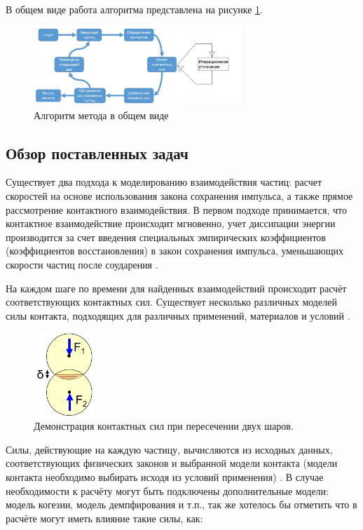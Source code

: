 \documentclass[utf8x, 14pt, oneside, a4paper]{article}
\begin{document}
В общем виде работа алгоритма представлена на рисунке \ref{pic:algo}.

\begin{figure}[H]
	\centering
	\includegraphics[width=0.7\textwidth]{algorithm}
	\caption{Алгоритм метода в общем виде}
	\label{pic:algo}
\end{figure} 

\subsection*{Обзор поставленных задач}

Существует два подхода к моделированию взаимодействия частиц: расчет скоростей на основе использования закона сохранения импульса, а также прямое рассмотрение контактного взаимодействия. В первом подходе принимается, что контактное взаимодействие происходит мгновенно, учет диссипации энергии производится за счет введения специальных эмпирических коэффициентов (коэффициентов восстановления) в закон сохранения импульса, уменьшающих скорости частиц после соударения \cite{cundall}.

На каждом шаге по времени для найденных взаимодействий происходит расчёт соответствующих контактных сил.
Существует несколько различных моделей силы контакта, подходящих для различных применений, материалов и условий \cite{hard_aglomerath}.

\begin{figure}[h!]
	\centering
	\includegraphics[width=0.2\textwidth]{vhod}
	\caption{Демонстрация контактных сил при пересечении двух шаров.}
\end{figure} 

Силы, действующие на каждую частицу, вычисляются из исходных данных, соответствующих физических законов и выбранной модели контакта (модели контакта необходимо выбирать исходя из условий применения) \cite{some}. 
В случае необходимости к расчёту могут быть подключены дополнительные модели: модель когезии, модель демпфирования и т.п., так же хотелось бы отметить что в расчёте могут иметь влияние такие силы, как:
\end{document}
